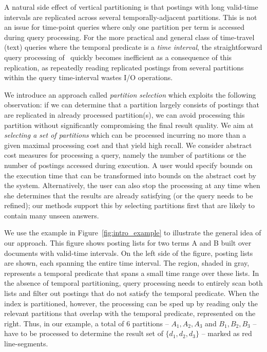 A natural side effect of vertical partitioning is that postings with long valid-time intervals are replicated across several temporally-adjacent partitions. This is not an issue for time-point queries where only one partition per term is accessed during query processing. For the more practical and general class of time-travel (text) queries where the temporal predicate is a \emph{time interval}, the straightforward query processing of~\cite{kberberi:sigir2007} quickly becomes inefficient as a consequence of this replication, as repeatedly reading replicated postings from several partitions within the query time-interval wastes I/O operations. 


We introduce an approach called \emph{partition selection} which  exploits the following observation: %
if we can determine that a partition largely consists of postings that are replicated in
already processed partition(s), we can avoid processing this
partition without significantly compromising the final result
quality. 
We aim at \textit{selecting a set of partitions} which can be processed
incurring no more than a given maximal processing cost and 
that yield high recall.
We consider abstract
cost measures for processing a query, namely
the number of partitions or the number of postings 
accessed during execution. A user would specify bounds
on the execution time that can be transformed into bounds on the abstract
cost by the system. Alternatively, the user can also stop the processing
at any time when she determines that the results are already satisfying
(or the query needs to be refined); our methods support this
by selecting partitions first that are likely to contain many unseen answers.

We use the example in Figure~\ref{fig:intro_example} to
illustrate the general idea of our approach. This figure shows posting lists for two terms \textsc{A} and \textsc{B}
built over documents with valid-time intervals. On
the left side of the figure, posting lists are shown, each spanning
the entire time interval. %
The region, shaded in gray, represents a temporal predicate that spans a small time
range over these lists. In the absence of temporal partitioning, 
query processing needs to entirely scan both lists and
filter out postings that do not satisfy the temporal
predicate. When the index is partitioned, however, the processing can
be sped up by reading only the relevant partitions that overlap with
the temporal predicate, represented on the right. Thus, in our example, a total of 6 partitions -- $A_1, A_2,
A_3$ and $B_1, B_2, B_3$ -- have to be processed to determine the
result set of $\{d_1, d_2, d_3\}$ -- marked as red line-segments.


